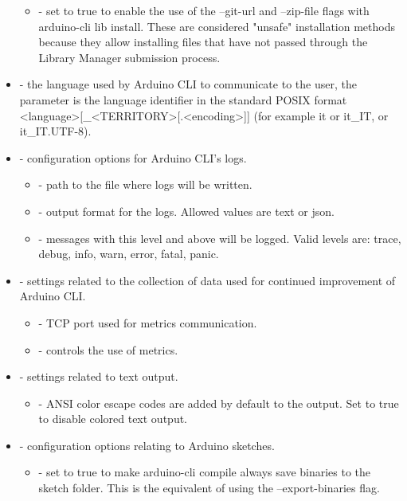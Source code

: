 \begin{itemize}
	\begin{itemize}
		\item {} - set to true to enable the use of the --git-url and --zip-file flags with arduino-cli lib install. These are considered "unsafe" installation methods because they allow installing files that have not passed through the Library Manager submission process.
	\end{itemize}
	\item {} - the language used by Arduino CLI to communicate to the user, the parameter is the language identifier in the standard POSIX format <language>[\_<TERRITORY>[.<encoding>]] (for example it or it\_IT, or it\_IT.UTF-8).
	\item {} - configuration options for Arduino CLI's logs.
	\begin{itemize}
		\item {} - path to the file where logs will be written.
		\item {} - output format for the logs. Allowed values are text or json.
		\item {} - messages with this level and above will be logged. Valid levels are: trace, debug, info, warn, error, fatal, panic.
	\end{itemize}
	\item {} - settings related to the collection of data used for continued improvement of Arduino CLI.
	\begin{itemize}
		\item {} - TCP port used for metrics communication.
		\item {} - controls the use of metrics.
	\end{itemize}
	\item {} - settings related to text output.
	\begin{itemize}
		\item {} - ANSI color escape codes are added by default to the output. Set to true to disable colored text output.
	\end{itemize}
	\item {} - configuration options relating to Arduino sketches.
	\begin{itemize}
		\item {} - set to true to make arduino-cli compile always save binaries to the sketch folder. This is the equivalent of using the --export-binaries flag.

\end{itemize}
\end{itemize}
